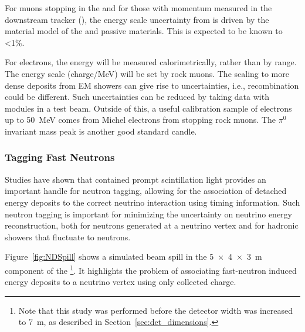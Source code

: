 For muons stopping in the  and for those with momentum measured in the downstream tracker (), the energy scale uncertainty from  is driven by the material model of the  and passive materials.  This is expected to be known to \textless 1\%.

For electrons, the energy will be measured calorimetrically, rather than by range.  The  energy scale (charge/MeV) will be set by rock muons.  The scaling to more dense deposits from EM showers can give rise to uncertainties, i.e., recombination could be different.  Such uncertainties can be reduced by taking data with  modules in a test beam.  Outside of this, a useful calibration sample
of electrons up to \SI{50}{MeV} comes from Michel electrons from stopping rock muons. The $\pi^0$ invariant mass peak is another good standard candle.



\subsubsection{Tagging Fast Neutrons}

Studies have shown that contained prompt scintillation light provides an important handle for neutron tagging, allowing for the association of detached energy deposits to the correct neutrino interaction using timing information. Such neutron tagging is important for minimizing the uncertainty on neutrino energy reconstruction, both for neutrons generated at a neutrino vertex and for hadronic showers that fluctuate to neutrons. 

Figure~\ref{fig:NDSpill} shows a simulated beam spill in the \SI[product-units=repeat]{5x4x3}{\metre}  component of the   \footnote{Note that this study was performed before the detector width was increased to \SI{7}{m}, as described in Section~\ref{sec:det_dimensions}.}. 
It highlights the problem of associating fast-neutron induced energy deposits to a neutrino vertex using only collected charge.  

